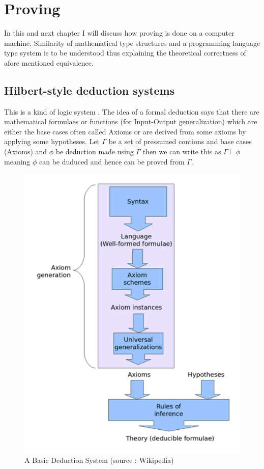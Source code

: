 \chapter{Proving}
\graphicspath{ {./images/} }

In this and next chapter I will discuss how proving is done on a computer machine. Similarity of mathematical type structures and a programming language type system is to be understood thus explaining the theoretical correctness of afore mentioned equivalence.

\section{Hilbert-style deduction systems }
This is a kind of logic system \cite{hilbert_system}. The idea of a formal deduction says that there are mathematical formulaes or functions (for Input-Output generalization) which are either the base cases often called Axioms or are derived from some axioms by applying some hypotheses. Let $\Gamma$ be a set of pressumed contions and base cases (Axioms) and $\phi$ be deduction made using $\Gamma$ then we can write this as $\Gamma\vdash\phi$ meaning $\phi$ can be duduced and hence can be proved from $\Gamma$. 


\begin{figure}[!htb]
\centering
  \includegraphics[scale=0.4]{hilbert}
  \caption{A Basic Deduction System (source : Wikipedia)}
\end{figure}

